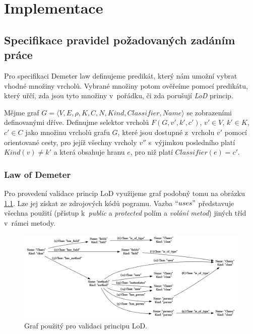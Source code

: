 \chapter{Implementace}


\section{Specifikace pravidel požadovaných zadáním práce}
Pro specifikaci Demeter law definujeme predikát, který nám umožní vybrat vhodné množiny vrcholů. Vybrané množiny potom ověřeíme pomocí predikátu, který uřčí, zda jsou tyto množiny v~pořádku, či zda porušují \emph{LoD} princip.

\begin{definition}
Mějme graf $G = \langle V, E, \rho, K, C, N, \mathit{Kind}, \mathit{Classifier}, \mathit{Name}\rangle$ se zobrazeními definovanými dříve. Definujme selektor vrcholů $F(G, v', k', c')$, $v' \in V$, $k' \in K$, $c' \in C$ jako množinu vrcholů grafu $G$, které jsou dostupné z~vrcholu $v'$ pomocí orientované cesty, pro jejíž všechny vrcholy $v''$ s~výjimkou posledního platí $Kind(v) \ne k'$ a která obsahuje hranu $e$, pro niž platí $Classifier(e) = c' $.
\end{definition}

\subsection{Law of Demeter}
Pro provedení validace princip LoD využijeme graf podobný tomu na obrázku \ref{implementation-lod_graph}. Lze jej získat ze zdrojových kódů pogramu. Vazba $``uses"$ představuje všechna použití (přístup k~\emph{public} a \emph{protected} polím a \emph{volání metod}) jiných tříd v~rámci metody.

\begin{figure}[h!]
  \centering
  \includegraphics[width=1.0\textwidth]{./graphs/demeter_graph.png}
  \caption{Graf použitý pro validaci principu LoD.\label{implementation-lod_graph}}
\end{figure}

